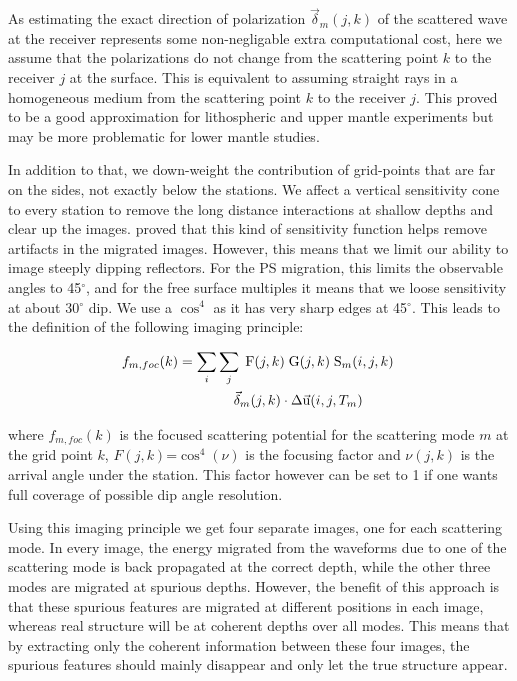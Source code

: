 \documentclass[10pt,a4paper]{article}
\numberwithin{equation}{section}
\begin{document}
As estimating the exact direction of polarization $\vec{\delta}_m(j,k)$ of the scattered wave at the receiver represents some non-negligable extra computational cost, here we assume that the polarizations do not change from the scattering point $k$ to the receiver $j$ at the surface.
This is equivalent to assuming straight rays in a homogeneous medium from the scattering point $k$ to the receiver $j$.
This proved to be a good approximation for lithospheric and upper mantle experiments but may be more problematic for lower mantle studies. 

In addition to that, we down-weight the contribution of grid-points that are far on the sides, not exactly below the stations.
We affect a vertical sensitivity cone to every station to remove the long distance interactions at shallow depths and clear up the images.
\cite{cheng_gji_16} proved that this kind of sensitivity function helps remove artifacts in the migrated images.
However, this means that we limit our ability to image steeply dipping reflectors.
For the PS migration, this limits the observable angles to 45$^{\circ}$, and for the free surface multiples it means that we loose sensitivity at about 30$^{\circ}$ dip.
We use a $\cos^4$ as it has very sharp edges at 45$^{\circ}$.
This leads to the definition of the following imaging principle:

\begin{align}
  f_{m,foc}(k) &= \sum_i \sum_j \; \text{F}(j,k) \; \text{G}(j,k) \; \text{S}_{m}(i,j,k) \; \notag\\&\qquad\qquad \vec{\delta}_{m}(j,k) \cdot \Delta\vec{\text{u}}(i,j,T_m)
  \label{foc}
\end{align}
\vspace{1mm}

\noindent where $f_{m,foc}(k)$ is the focused scattering potential for the scattering mode $m$ at the grid point $k$, $F(j,k)$=$\cos^4(\nu)$ is the focusing factor and $\nu(j,k)$ is the arrival angle under the station.
This factor however can be set to 1 if one wants full coverage of possible dip angle resolution.

Using this imaging principle we get four separate images, one for each scattering mode.
In every image, the energy migrated from the waveforms due to one of the scattering mode is back propagated at the correct depth, while the other three modes are migrated at spurious depths.
However, the benefit of this approach is that these spurious features are migrated at different positions in each image, whereas real structure will be at coherent depths over all modes.
This means that by extracting only the coherent information between these four images, the spurious features should mainly disappear and only let the true structure appear.
\end{document}
